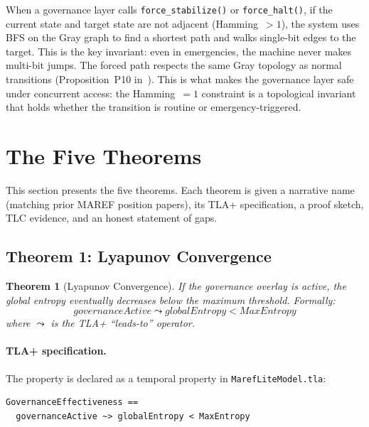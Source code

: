 \documentclass[11pt]{article}
\newtheorem{theorem}{Theorem}
\begin{document}
When a governance layer calls \texttt{force\_stabilize()} or
\texttt{force\_halt()}, if the current state and target state are not adjacent
(Hamming~$>1$), the system uses BFS on the Gray graph to find a shortest path
and walks single-bit edges to the target. This is the key invariant: even in
emergencies, the machine never makes multi-bit jumps. The forced path respects
the same Gray topology as normal transitions (Proposition~P10
in~\cite{maref-w3}). This is what makes the governance layer safe under
concurrent access: the Hamming~$=1$ constraint is a topological invariant that
holds whether the transition is routine or emergency-triggered.

\section{The Five Theorems}

This section presents the five theorems. Each theorem is given a narrative
name (matching prior MAREF position papers), its TLA+ specification, a proof
sketch, TLC evidence, and an honest statement of gaps.

\subsection{Theorem 1: Lyapunov Convergence}

\begin{theorem}[Lyapunov Convergence]
If the governance overlay is active, the global entropy eventually decreases
below the maximum threshold. Formally:
\[
\mathit{governanceActive} \leadsto \mathit{globalEntropy} < \mathit{MaxEntropy}
\]
where $\leadsto$ is the TLA+ ``leads-to'' operator.
\end{theorem}

\paragraph{TLA+ specification.} The property is declared as a temporal
property in \texttt{MarefLiteModel.tla}:

\begin{lstlisting}
GovernanceEffectiveness ==
  governanceActive ~> globalEntropy < MaxEntropy
\end{lstlisting}
\end{document}
